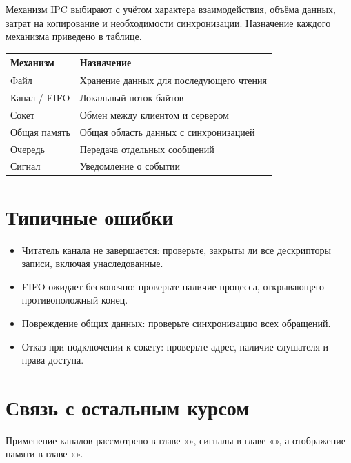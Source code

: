 Механизм IPC выбирают с учётом характера взаимодействия, объёма данных, затрат на копирование и необходимости синхронизации. Назначение каждого механизма приведено в таблице.

\par\addvspace{10pt}\noindent\begin{minipage}{\linewidth}
\centering
\begin{tabular}{@{}p{.32\linewidth}p{.62\linewidth}@{}}
\toprule
\textbf{Механизм} & \textbf{Назначение} \\
\midrule
Файл & Хранение данных для последующего чтения \\
Канал / FIFO & Локальный поток байтов \\
Сокет & Обмен между клиентом и сервером \\
Общая память & Общая область данных с синхронизацией \\
Очередь & Передача отдельных сообщений \\
Сигнал & Уведомление о событии \\
\bottomrule
\end{tabular}
\end{minipage}\par\addvspace{10pt}


\section{Типичные ошибки}
\begin{itemize}[nosep]
  \item Читатель канала не завершается: проверьте, закрыты ли все дескрипторы записи, включая унаследованные.
  \item FIFO ожидает бесконечно: проверьте наличие процесса, открывающего противоположный конец.
  \item Повреждение общих данных: проверьте синхронизацию всех обращений.
  \item Отказ при подключении к сокету: проверьте адрес, наличие слушателя и права доступа.
\end{itemize}

\section{Связь с остальным курсом}

Применение каналов рассмотрено в главе «», сигналы в главе «», а отображение памяти в главе «».

